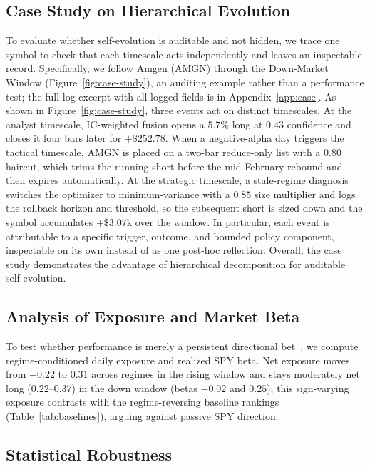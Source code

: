 \documentclass[letterpaper]{article}
\begin{document}
\subsection{Case Study on Hierarchical Evolution}

To evaluate whether self-evolution is auditable and not hidden, we trace
one symbol to check that each timescale acts independently and leaves an
inspectable record. Specifically, we follow Amgen (AMGN) through the
Down-Market Window (Figure~\ref{fig:case-study}), an auditing example
rather than a performance test; the full log excerpt with all logged
fields is in Appendix~\ref{app:case}. As shown in
Figure~\ref{fig:case-study}, three events act on distinct timescales.
At the analyst timescale, IC-weighted fusion opens a $5.7\%$ long at
$0.43$ confidence and closes it four bars later for $+\$252.78$. When a
negative-alpha day triggers the tactical timescale, AMGN is placed on a
two-bar reduce-only list with a $0.80$ haircut, which trims the running
short before the mid-February rebound and then expires automatically.
At the strategic timescale, a stale-regime diagnosis switches the
optimizer to minimum-variance with a $0.85$ size multiplier and logs
the rollback horizon and threshold, so the subsequent short is sized
down and the symbol accumulates $+\$3.07$k over the window. In
particular, each event is attributable to a specific trigger, outcome,
and bounded policy component, inspectable on its own instead of as one
post-hoc reflection. Overall, the case study demonstrates the advantage
of hierarchical decomposition for auditable self-evolution.

\subsection{Analysis of Exposure and Market Beta}

To test whether performance is merely a persistent directional
bet~\citep{zhu2026ktdfin,duan2026tradelens}, we compute regime-conditioned
daily exposure and realized SPY beta. Net exposure moves from $-0.22$ to
$0.31$ across regimes in the rising window and stays moderately net long
($0.22$--$0.37$) in the down window (betas $-0.02$ and $0.25$); this
sign-varying exposure contrasts with the regime-reversing baseline rankings
(Table~\ref{tab:baselines}), arguing against passive SPY direction.

\subsection{Statistical Robustness}
\end{document}
